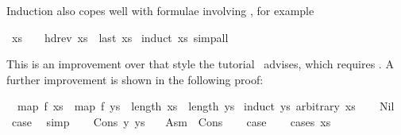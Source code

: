 \begin{isabellebody}
\begin{isamarkuptext}
Induction also copes well with formulae involving , for example%
\end{isamarkuptext}%
\isamarkuptrue%
\isamarkupfalse%
\ {}xs\ {}\ {}{}\ {}\ hd{}rev\ xs{}\ {}\ last\ xs{}\isanewline
%
\isadelimproof
%
\endisadelimproof
%
\isatagproof
{}\isamarkupfalse%
\ {}induct\ xs{}\ simp{}all%
\endisatagproof
{\isafoldproof}%
%
\isadelimproof
%
\endisadelimproof
%
\begin{isamarkuptext}%
\noindent This is an improvement over that style the
tutorial~\cite{LNCS2283} advises, which requires .
A further improvement is shown in the following proof:%
\end{isamarkuptext}%
\isamarkuptrue%
\isamarkupfalse%
\ \ {}map\ f\ xs\ {}\ map\ f\ ys\ {}\ length\ xs\ {}\ length\ ys{}\isanewline
%
\isadelimproof
%
\endisadelimproof
%
\isatagproof
{}\isamarkupfalse%
\ {}induct\ ys\ arbitrary{}\ xs{}\isanewline
\ \ \isamarkupfalse%
\ Nil\ \isamarkupfalse%
\ {}case\ \isamarkupfalse%
\ simp\isanewline
{}\isamarkupfalse%
\isanewline
\ \ \isamarkupfalse%
\ {}Cons\ y\ ys{}\ \ \isamarkupfalse%
\ Asm\ {}\ Cons\isanewline
\ \ \isamarkupfalse%
\ {}case\isanewline
\ \ \isamarkupfalse%
\ {}cases\ xs{}\isanewline
\ \ \ \ \isamarkupfalse%

\end{isabellebody}
